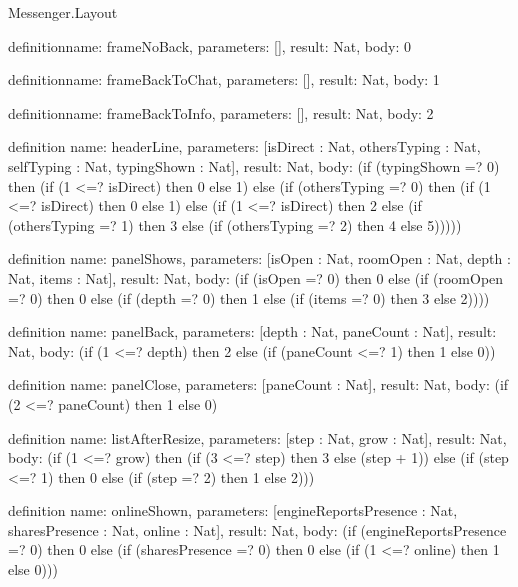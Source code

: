 \begin{lexlean}{Messenger.Layout}
\begin{semanticmodule}
definition{name: frameNoBack, parameters: [], result: Nat, body: 0}

definition{name: frameBackToChat, parameters: [], result: Nat, body: 1}

definition{name: frameBackToInfo, parameters: [], result: Nat, body: 2}

definition{
  name: headerLine,
  parameters: [isDirect : Nat, othersTyping : Nat, selfTyping : Nat, typingShown : Nat],
  result: Nat,
  body: (if (typingShown =? 0) then (if (1 <=? isDirect) then 0 else 1) else (if (othersTyping =? 0) then (if (1 <=? isDirect) then 0 else 1) else (if (1 <=? isDirect) then 2 else (if (othersTyping =? 1) then 3 else (if (othersTyping =? 2) then 4 else 5)))))
}

definition{
  name: panelShows,
  parameters: [isOpen : Nat, roomOpen : Nat, depth : Nat, items : Nat],
  result: Nat,
  body: (if (isOpen =? 0) then 0 else (if (roomOpen =? 0) then 0 else (if (depth =? 0) then 1 else (if (items =? 0) then 3 else 2))))
}

definition{
  name: panelBack,
  parameters: [depth : Nat, paneCount : Nat],
  result: Nat,
  body: (if (1 <=? depth) then 2 else (if (paneCount <=? 1) then 1 else 0))
}

definition{
  name: panelClose,
  parameters: [paneCount : Nat],
  result: Nat,
  body: (if (2 <=? paneCount) then 1 else 0)
}

definition{
  name: listAfterResize,
  parameters: [step : Nat, grow : Nat],
  result: Nat,
  body: (if (1 <=? grow) then (if (3 <=? step) then 3 else (step + 1)) else (if (step <=? 1) then 0 else (if (step =? 2) then 1 else 2)))
}

definition{
  name: onlineShown,
  parameters: [engineReportsPresence : Nat, sharesPresence : Nat, online : Nat],
  result: Nat,
  body: (if (engineReportsPresence =? 0) then 0 else (if (sharesPresence =? 0) then 0 else (if (1 <=? online) then 1 else 0)))
}
\end{semanticmodule}
\end{lexlean}
